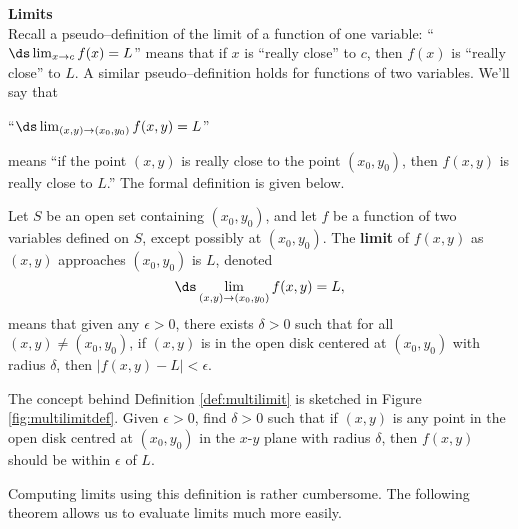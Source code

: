\noindent\textbf{\large Limits}\\

Recall a pseudo--definition of the limit of a function of one variable: ``$\ds \lim_{x\to c}f(x) = L$'' means that if $x$ is ``really close'' to $c$, then $f(x)$ is ``really close'' to $L$. A similar pseudo--definition holds for functions of two variables. We'll say that 

\begin{center}
``$\ds \lim_{(x,y)\to (x_0,y_0)} f(x,y) = L$'' 
\end{center}
means ``if the point $(x,y)$ is really close to the point $(x_0,y_0)$, then $f(x,y)$ is really close to $L$.'' The formal definition is given below.


{Let $S$ be an open set containing $(x_0,y_0)$, and let $f$ be a function of two variables defined on $S$, except possibly at $(x_0,y_0)$. 
The \textbf{limit} of $f(x,y)$ as $(x,y)$ approaches $(x_0,y_0)$ is $L$, denoted $$\ds \lim_{(x,y)\to (x_0,y_0)} f(x,y) = L,$$
means that given any $\epsilon>0$, there exists $\delta>0$ such that for all  $(x,y)\neq (x_0,y_0)$, if $(x,y)$ is in the open disk centered at $(x_0,y_0)$ with radius $\delta$, then $|f(x,y) - L|<\epsilon.$
}


The concept behind Definition \ref{def:multilimit} is sketched in Figure \ref{fig:multilimitdef}. Given $\epsilon>0$, find $\delta>0$ such that if $(x,y)$ is any point in the open disk centred at $(x_0,y_0)$ in the $x$-$y$ plane with radius $\delta$, then $f(x,y)$ should be within $\epsilon$ of $L$. 

\pagebreak

Computing limits using this definition is rather cumbersome. The following theorem allows us to evaluate limits much more easily.



